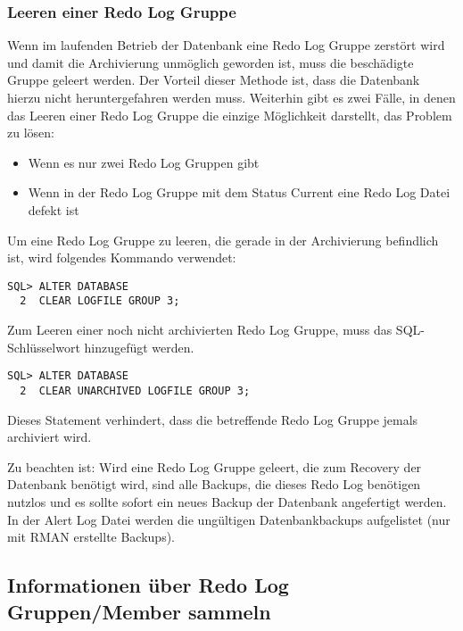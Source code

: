         \subsubsection{Leeren einer Redo Log Gruppe}
          Wenn im laufenden Betrieb der Datenbank eine Redo Log Gruppe zerst\"ort wird und damit die Archivierung unm\"oglich geworden ist, muss die besch\"adigte Gruppe geleert werden. Der Vorteil dieser Methode ist, dass die Datenbank hierzu nicht heruntergefahren werden muss. Weiterhin gibt es zwei F\"alle, in denen das Leeren einer Redo Log Gruppe die einzige M\"oglichkeit darstellt, das Problem zu l\"osen:
          \begin{itemize}
            \item Wenn es nur zwei Redo Log Gruppen gibt
            \item Wenn in der Redo Log Gruppe mit dem Status Current eine Redo Log Datei defekt ist
          \end{itemize}
          Um eine Redo Log Gruppe zu leeren, die gerade in der Archivierung befindlich ist, wird folgendes Kommando verwendet:
          \begin{lstlisting}[caption={Redo Log Gruppe leeren},label=admin46,language=oracle_sql]
SQL> ALTER DATABASE
  2  CLEAR LOGFILE GROUP 3;
        \end{lstlisting}
        Zum Leeren einer noch nicht archivierten Redo Log Gruppe, muss das SQL-Schl\"usselwort  hinzugef\"ugt werden.
        \begin{lstlisting}[caption={Eine nicht archivierte Redo Log Gruppe leeren},label=admin47,language=oracle_sql]
SQL> ALTER DATABASE
  2  CLEAR UNARCHIVED LOGFILE GROUP 3;
        \end{lstlisting}
        Dieses Statement verhindert, dass die betreffende Redo Log Gruppe jemals archiviert wird.
        \begin{merke}
          Zu beachten ist: Wird eine Redo Log Gruppe geleert, die zum Recovery der Datenbank ben\"otigt wird, sind alle Backups, die dieses Redo Log ben\"otigen nutzlos und es sollte sofort ein neues Backup der Datenbank angefertigt werden. In der Alert Log Datei werden die ung\"ultigen Datenbankbackups aufgelistet (nur mit RMAN erstellte Backups).
        \end{merke}
      \subsection{Informationen \"uber Redo Log Gruppen/Member sammeln}
        \begin{literaturinternet}
          \item \cite{i1007497}
        \end{literaturinternet}
